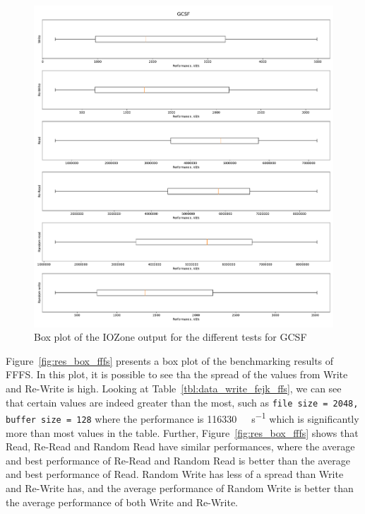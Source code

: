 \begin{figure}[!htb]
	\label{fig:res_box_gcsf}
	\begin{center}
		\includegraphics[width=1.0\textwidth]{figures/benchmarking/gcsf/GCSF-box.pdf}
	\end{center}
	\caption{Box plot of the IOZone output for the different tests for GCSF}
\end{figure}

Figure~\ref{fig:res_box_fffs} presents a box plot of the benchmarking results of FFFS. In this plot, it is possible to see tha the spread of the values from Write and Re-Write is high. Looking at Table~\ref{tbl:data_write_fejk_ffs}, we can see that certain values are indeed greater than the most, such as \texttt{file size = 2048, buffer size = 128} where the performance is \SI[per-mode = symbol]{116330}{\kilo\byte\per\second} which is significantly more than most values in the table. Further, Figure~\ref{fig:res_box_fffs} shows that Read, Re-Read and Random Read have similar performances, where the average and best performance of Re-Read and Random Read is better than the average and best performance of Read. Random Write has less of a spread than Write and Re-Write has, and the average performance of Random Write is better than the average performance of both Write and Re-Write.


